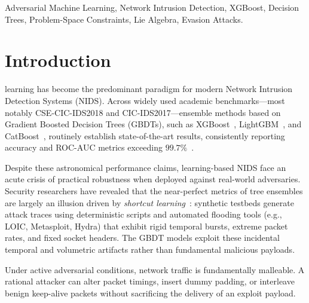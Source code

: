 \documentclass[10pt,journal,compsoc]{IEEEtran}
\begin{document}
{\begin{IEEEkeywords}
Adversarial Machine Learning, Network Intrusion Detection, XGBoost, Decision Trees, Problem-Space Constraints, Lie Algebra, Evasion Attacks.
\end{IEEEkeywords}}

\maketitle
\IEEEdisplaynontitleabstractindextext
\IEEEpeerreviewmaketitle

\section{Introduction}
 learning has become the predominant paradigm for modern Network Intrusion Detection Systems (NIDS). Across widely used academic benchmarks---most notably CSE-CIC-IDS2018 and CIC-IDS2017---ensemble methods based on Gradient Boosted Decision Trees (GBDTs), such as XGBoost~\cite{chen2016xgboost}, LightGBM~\cite{ke2017lightgbm}, and CatBoost~\cite{prokhorenkova2018catboost}, routinely establish state-of-the-art results, consistently reporting accuracy and ROC-AUC metrics exceeding $99.7\%$~\cite{apruzzese2022role, sghamizi2022tabularbench}.

Despite these astronomical performance claims, learning-based NIDS face an acute crisis of practical robustness when deployed against real-world adversaries. Security researchers have revealed that the near-perfect metrics of tree ensembles are largely an illusion driven by \emph{shortcut learning}~\cite{geirhos2020shortcut}: synthetic testbeds generate attack traces using deterministic scripts and automated flooding tools (e.g., LOIC, Metasploit, Hydra) that exhibit rigid temporal bursts, extreme packet rates, and fixed socket headers. The GBDT models exploit these incidental temporal and volumetric artifacts rather than fundamental malicious payloads.

Under active adversarial conditions, network traffic is fundamentally malleable. A rational attacker can alter packet timings, insert dummy padding, or interleave benign keep-alive packets without sacrificing the delivery of an exploit payload. 
\end{document}
